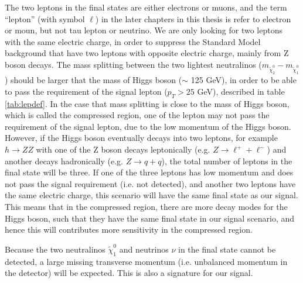 The two leptons in the final states are either electrons or muons, and the term ``lepton'' (with symbol $\ell$) in the later chapters in this thesis is refer to electron or moun, but not tau lepton or neutrino.
We are only looking for two leptons with the same electric charge, in order to suppress the Standard Model background that have two leptons with opposite electric charge, mainly from Z boson decays.
The mass splitting between the two lightest neutralinos ($m_{\tilde{\chi}_2^0} - m_{\tilde{\chi}_1^0}$) should be larger that the mass of Higgs boson ($\sim$ 125 GeV), in order to be able to pass the requirement of the signal lepton ($p_T > 25$ GeV), described in table \ref{tab:lepdef}.
In the case that mass splitting is close to the mass of Higgs boson, which is called the compressed region, one of the lepton may not pass the requirement of the signal lepton, due to the low momentum of the Higgs boson.
However, if the Higgs boson eventually decays into two leptons, for example $h \rightarrow ZZ$ with one of the Z boson decays leptonically (e.g. $Z \rightarrow \ell^{+} + \ell^{-}$) and another decays hadronically (e.g. $Z \rightarrow q + q$), the total number of leptons in the final state will be three.
If one of the three leptons has low momentum and does not pass the signal requirement (i.e. not detected), and another two leptons have the same electric charge, this scenario will have the same final state as our signal.
This means that in the compressed region, there are more decay modes for the Higgs boson, such that they have the same final state in our signal scenario, and hence this will contributes more sensitivity in the compressed region.

Because the two neutralinos $\tilde{\chi}_1^0$ and neutrinos $\nu$ in the final state cannot be detected, a large missing transverse momentum (i.e. unbalanced momentum in the detector) will be expected.
This is also a signature for our signal.
